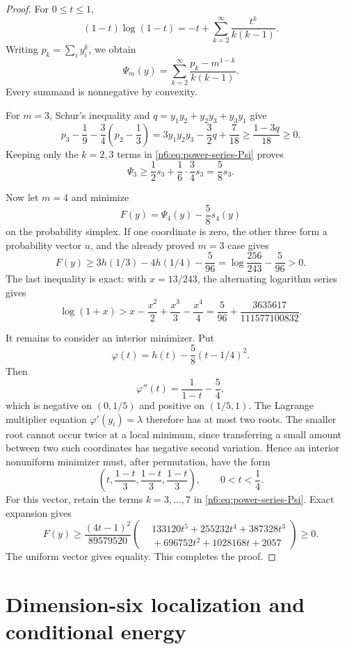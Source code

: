 \documentclass[11pt]{article}
\numberwithin{equation}{section}
\theoremstyle{definition}
\begin{document}
\begin{proof}
For $0\le t\le1$,
\[
 (1-t)\log(1-t)
 =-t+\sum_{k=2}^{\infty}\frac{t^k}{k(k-1)}.
\]
Writing $p_k=\sum_i y_i^k$, we obtain
\begin{equation}
 \Psi_m(y)
 =\sum_{k=2}^{\infty}
   \frac{p_k-m^{1-k}}{k(k-1)}.\label{n6:eq:power-series-Psi}
\end{equation}
Every summand is nonnegative by convexity.

For $m=3$, Schur's inequality and
$q=y_1y_2+y_2y_3+y_3y_1$ give
\[
 p_3-\frac19-\frac34\left(p_2-\frac13\right)
 =3y_1y_2y_3-\frac32q+\frac7{18}
 \ge\frac{1-3q}{18}\ge0.
\]
Keeping only the $k=2,3$ terms in \eqref{n6:eq:power-series-Psi} proves
\[
 \Psi_3\ge\frac12s_3+\frac16\cdot\frac34s_3=\frac58s_3.
\]

Now let $m=4$ and minimize
\[
 F(y)=\Psi_4(y)-\frac58s_4(y)
\]
on the probability simplex.  If one coordinate is zero, the other three form
a probability vector $u$, and the already proved $m=3$ case gives
\[
 F(y)
 \ge
 3h(1/3)-4h(1/4)-\frac5{96}
 =\log\frac{256}{243}-\frac5{96}>0.\label{n6:eq:boundary-gap}
\]
The last inequality is exact: with $x=13/243$, the alternating logarithm
series gives
\[
 \log(1+x)
 >x-\frac{x^2}{2}+\frac{x^3}{3}-\frac{x^4}{4}
 =\frac5{96}+\frac{3635617}{111577100832}.
\]

It remains to consider an interior minimizer.  Put
\[
 \varphi(t)=h(t)-\frac58(t-1/4)^2.
\]
Then
\[
 \varphi''(t)=\frac1{1-t}-\frac54,
\]
which is negative on $(0,1/5)$ and positive on $(1/5,1)$.  The Lagrange
multiplier equation $\varphi'(y_i)=\lambda$ therefore has at most two roots.
The smaller root cannot occur twice at a local minimum, since transferring a
small amount between two such coordinates has negative second variation.
Hence an interior nonuniform minimizer must, after permutation, have the form
\[
 \left(t,\frac{1-t}{3},\frac{1-t}{3},\frac{1-t}{3}\right),
 \qquad 0<t<\frac14.
\]
For this vector, retain the terms $k=3,\dots,7$ in
\eqref{n6:eq:power-series-Psi}.  Exact expansion gives
\[
 F(y)\ge
 \frac{(4t-1)^2}{89579520}
 \left(
 \begin{aligned}
 &133120t^5+255232t^4+387328t^3\\
 &{}+696752t^2+1028168t+2057
 \end{aligned}
 \right)\ge0.
\]
The uniform vector gives equality.  This completes the proof.
\end{proof}

\section{Dimension-six localization and conditional energy}\label{n6:sec:localization}
\end{document}
